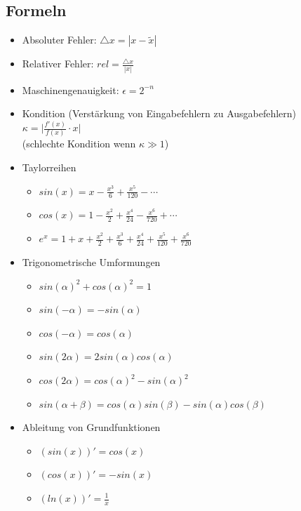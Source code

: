 \subsection{Formeln}
\begin{itemize}

	\item Absoluter Fehler: $\bigtriangleup x = |x - \widetilde{x}|$
	
	\item Relativer Fehler: $rel = \frac{\bigtriangleup x}{|x|}$
	
	\item Maschinengenauigkeit: $\epsilon = 2^{-n}$
	
	\item Kondition (Verstärkung von Eingabefehlern zu Ausgabefehlern) \\
	$\kappa = \bigg|\frac{f'(x)}{f(x)} \cdot x\bigg|$\\
	(schlechte Kondition wenn $\kappa \gg 1$)
	
	\item Taylorreihen
	\begin{itemize}
		\item $sin(x) = x - \frac{x^3}{6} + \frac{x^5}{120} - \cdots$
		\item $cos(x) = 1 - \frac{x^2}{2} + \frac{x^4}{24} - \frac{x^6}{720} + \cdots$
		\item $e^x = 1 + x + \frac{x^2}{2} + \frac{x^3}{6} + \frac{x^4}{24} + \frac{x^5}{120} + \frac{x^6}{720}$
	\end{itemize}
	
	\item Trigonometrische Umformungen
	\begin{itemize}
		\item $sin(\alpha )^2 + cos(\alpha )^2 = 1$
		\item $sin(-\alpha ) = -sin(\alpha )$
		\item $cos(-\alpha ) = cos(\alpha )$
		\item $sin(2 \alpha ) = 2 sin(\alpha ) cos(\alpha )$
		\item $cos(2 \alpha ) = cos(\alpha )^2 - sin(\alpha )^2$
		\item $sin(\alpha + \beta ) = cos(\alpha ) sin(\beta ) - sin(\alpha ) cos(\beta )$
	\end{itemize}
	
	\item Ableitung von Grundfunktionen
	\begin{itemize}
		\item $(sin(x))' = cos(x)$
		\item $(cos(x))' = -sin(x)$
		\item $(ln(x))' = \frac{1}{x}$
	\end{itemize}

\end{itemize}
